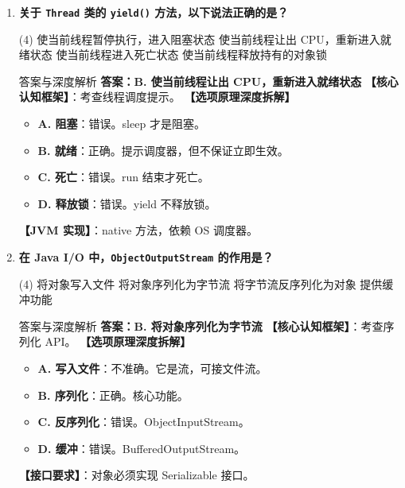 \documentclass[12pt, a4paper]{ctexart}
\newcommand{\code}[1]{\texttt{#1}}
\begin{document}
\begin{enumerate}[label=\textbf{\arabic*.}, itemsep=1em]
    \item \textbf{关于 \code{Thread} 类的 \code{yield()} 方法，以下说法正确的是？}
    \begin{tasks}(4)
        \task 使当前线程暂停执行，进入阻塞状态 \task 使当前线程让出 CPU，重新进入就绪状态
        \task 使当前线程进入死亡状态 \task 使当前线程释放持有的对象锁
    \end{tasks}
    \begin{bluebox}{答案与深度解析}
    \textbf{答案：B. 使当前线程让出 CPU，重新进入就绪状态}
    \textbf{【核心认知框架】}：考查线程调度提示。
    \textbf{【选项原理深度拆解】}
    \begin{itemize}[leftmargin=*, nosep]
        \item \textbf{A. 阻塞}：错误。sleep 才是阻塞。
        \item \textbf{B. 就绪}：正确。提示调度器，但不保证立即生效。
        \item \textbf{C. 死亡}：错误。run 结束才死亡。
        \item \textbf{D. 释放锁}：错误。yield 不释放锁。
    \end{itemize}
    \textbf{【JVM 实现】}：native 方法，依赖 OS 调度器。
    \end{bluebox}

    \item \textbf{在 Java I/O 中，\code{ObjectOutputStream} 的作用是？}
    \begin{tasks}(4)
        \task 将对象写入文件 \task 将对象序列化为字节流
        \task 将字节流反序列化为对象 \task 提供缓冲功能
    \end{tasks}
    \begin{bluebox}{答案与深度解析}
    \textbf{答案：B. 将对象序列化为字节流}
    \textbf{【核心认知框架】}：考查序列化 API。
    \textbf{【选项原理深度拆解】}
    \begin{itemize}[leftmargin=*, nosep]
        \item \textbf{A. 写入文件}：不准确。它是流，可接文件流。
        \item \textbf{B. 序列化}：正确。核心功能。
        \item \textbf{C. 反序列化}：错误。ObjectInputStream。
        \item \textbf{D. 缓冲}：错误。BufferedOutputStream。
    \end{itemize}
    \textbf{【接口要求】}：对象必须实现 Serializable 接口。
    \end{bluebox}


\end{enumerate}
\end{document}
